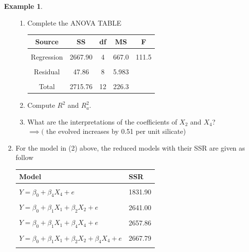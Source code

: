\documentclass[11pt,a4paper]{article}
\theoremstyle{definition}
\newtheorem{exa}[thm]{Example}
\begin{document}
\begin{exa}
\begin{enumerate}
\begin{enumerate}
     \item Complete the ANOVA TABLE\\
     
\begin{table}[H]
\centering
\begin{tabular}{|c|c|c|c|c|}
\hline
Source & SS & df & MS & F\\
\hline
&&&&\\
Regression & 2667.90 & 4 & 667.0 & 111.5\\
&&&&\\
Residual & 47.86 & 8 & 5.983 & \\
\hline
&&&&\\
Total & 2715.76 & 12 & 226.3 & \\
\hline
\end{tabular}
\end{table}     
   
   \item Compute $R^2$ and $R^2_a$.\\
   
   \item What are the interpretations of the coefficients of $X_2$ and $X_4$?\\
   
   $\implies ($ the evolved increases by 0.51 per unit silicate)\\    
\end{enumerate}


\item For the model in (2) above, the reduced models with their SSR are given as follow 
\begin{table}[H]
\centering
\begin{tabular}{ll}
Model                                         & SSR\\
\hline
&\\
$Y=\beta_0+\beta_4X_4+e$                      & 1831.90\\
&\\
$Y=\beta_0+\beta_1X_1+\beta_2X_2+e$            & 2641.00\\
&\\
$Y=\beta_0+\beta_1X_1+\beta_4X_4+e$            & 2657.86\\
&\\
$Y=\beta_0+\beta_1X_1+\beta_2X_2+\beta_4X_4+e$ & 2667.79\\
&\\
\end{tabular}
\end{table}



\end{enumerate}
\end{exa}
\end{document}
